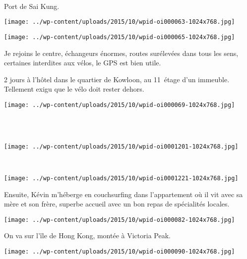 ~\\

\pagebreak
 
 Port de Sai Kung. 
\begin{center} \texttt{[image: ../wp-content/uploads/2015/10/wpid-oi000063-1024x768.jpg]} \end{center}
\begin{center} \texttt{[image: ../wp-content/uploads/2015/10/wpid-oi000065-1024x768.jpg]} \end{center}

 Je rejoins le centre, échangeurs énormes, routes surélevées dans tous les sens, certaines interdites aux vélos, le GPS est bien utile.
\pagebreak
 
 2 jours à l'hôtel dans le quartier de Kowloon, au 11\ieme\ étage d'un immeuble. Tellement exigu que le vélo doit rester dehors. 
\begin{center} \texttt{[image: ../wp-content/uploads/2015/10/wpid-oi000069-1024x768.jpg]} \end{center}
~\\~\\
\begin{center} \texttt{[image: ../wp-content/uploads/2015/10/wpid-oi0001201-1024x768.jpg]} \end{center}
\vspace{-\topsep}
\pagebreak

~\\
\vspace{0.75mm}
\begin{center} \texttt{[image: ../wp-content/uploads/2015/10/wpid-oi0001221-1024x768.jpg]} \end{center}

 Ensuite, Kévin m'héberge en couchsurfing dans l'appartement où il vit avec sa mère et son frère, superbe accueil avec un bon repas de spécialités locales. 
\begin{center} \texttt{[image: ../wp-content/uploads/2015/10/wpid-oi000082-1024x768.jpg]} \end{center}
\vspace{-\topsep}
\pagebreak
 
 On va sur l'île de Hong Kong, montée à Victoria Peak. 
\begin{center} \texttt{[image: ../wp-content/uploads/2015/10/wpid-oi000090-1024x768.jpg]} \end{center}

